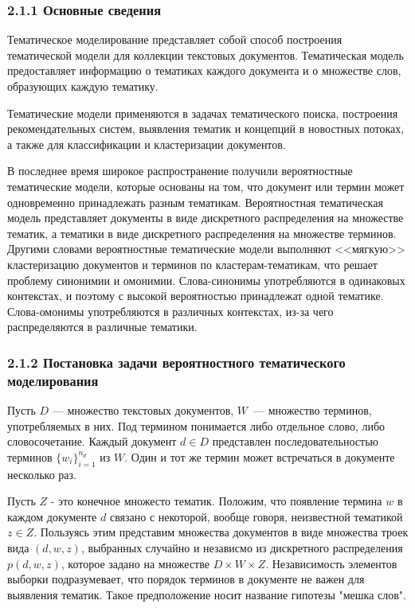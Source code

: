 \documentclass[a4paper]{report}
\begin{document}
	\subsubsection{2.1.1 Основные сведения}
	Тематическое моделирование представляет собой  способ построения тематической модели для коллекции текстовых документов. Тематическая модель предоставляет информацию о тематиках каждого документа и о множестве слов, образующих каждую тематику. 
	
	Тематические модели применяются в задачах тематического поиска, построения рекомендательных систем, выявления тематик и концепций в новостных потоках, а также для классификации и кластеризации документов. 
	
	В последнее время широкое распространение получили вероятностные тематические модели, которые основаны на том, что документ или термин может одновременно принадлежать разным тематикам. Вероятностная тематическая модель представляет документы в виде дискретного распределения на множестве тематик, а тематики в виде дискретного распределения на множестве терминов. Другими словами вероятностные тематические модели выполняют <<мягкую>> кластеризацию документов и терминов по кластерам-тематикам, что решает проблему синонимии и омонимии. Слова-синонимы употребляются в одинаковых контекстах, и поэтому с высокой вероятностью принадлежат одной тематике. Слова-омонимы употребляются в различных контекстах, из-за чего распределяются в различные тематики.
	
	
	\subsubsection{2.1.2 Постановка задачи вероятностного тематического моделирования}
	
	Пусть $D$ --- множество текстовых документов, $W$~--- множество терминов, употребляемых в них. Под термином понимается либо отдельное слово, либо словосочетание. Каждый документ $d \in D$ представлен последовательностью терминов 
	$ \{w_i\}_{i=1}^{n_d}$ из $W$.
	Один и тот же термин может встречаться в документе несколько раз.
	
	Пусть $Z$ - это конечное множесто тематик. Положим, что появление термина $w$ в каждом документе $d$ связано с некоторой, вообще говоря, неизвестной тематикой $z \in Z$. Пользуясь этим представим множества документов в виде множества троек вида $(d,w,z)$, выбранных случайно и независмо из дискретного распределения $p(d,w,z)$, которое задано на множестве $D \times W \times Z$. Независимость элементов выборки подразумевает, что порядок терминов в документе не важен для выявления тематик. Такое предположение носит название гипотезы "мешка слов".
	
\end{document}
